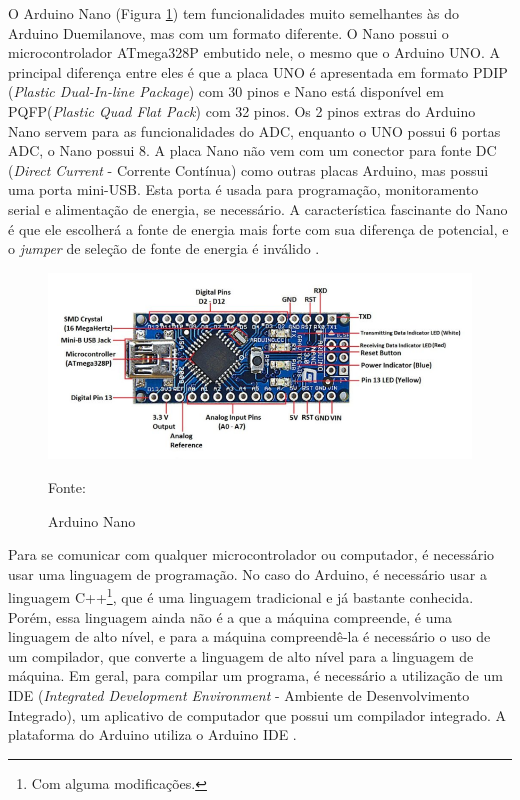 O Arduino Nano (Figura \ref{arduino}) tem funcionalidades muito semelhantes às do Arduino Duemilanove, mas com um formato diferente. O Nano possui o microcontrolador ATmega328P embutido nele, o mesmo que o Arduino UNO. A principal diferença entre eles é que a placa UNO é apresentada em formato PDIP (\textit{Plastic Dual-In-line Package}) com 30 pinos e Nano está disponível em PQFP(\textit{Plastic Quad Flat Pack}) com 32 pinos. Os 2 pinos extras do Arduino Nano servem para as funcionalidades do ADC, enquanto o UNO possui 6 portas ADC, o Nano possui 8. A placa Nano não vem com um conector para fonte DC (\textit{Direct Current} - Corrente Contínua) como outras placas Arduino, mas possui uma porta mini-USB. Esta porta é usada para programação, monitoramento serial e alimentação de energia, se necessário. A característica fascinante do Nano é que ele escolherá a fonte de energia mais forte com sua diferença de potencial, e o \textit{jumper} de seleção de fonte de energia é inválido \cite{john2018}.  

\begin{figure}[h]
	\centering
	\includegraphics[keepaspectratio=true,scale=0.7
	]{figuras/arduino_nano.png}
	\caption{ Arduino Nano }
	Fonte: \cite{john2018}
	\label{arduino}	
\end{figure}

Para se comunicar com qualquer microcontrolador ou computador, é necessário usar uma linguagem de programação. No caso do Arduino, é necessário usar a linguagem C++\footnote{Com alguma modificações.}, que é uma linguagem tradicional e já bastante conhecida. Porém, essa linguagem ainda não é a que a máquina compreende, é uma linguagem de alto nível, e para a máquina compreendê-la é necessário o uso de um compilador, que converte a linguagem de alto nível para a linguagem de máquina. Em geral, para compilar um programa, é necessário a utilização de um IDE (\textit{Integrated Development Environment} - Ambiente de Desenvolvimento Integrado), um aplicativo de computador que possui um compilador integrado. A plataforma do Arduino utiliza o Arduino IDE \cite{chavier2016}. 


